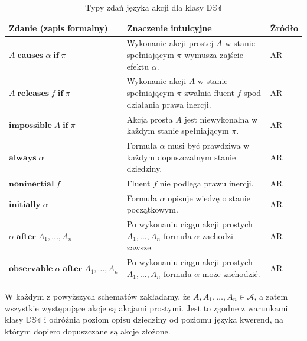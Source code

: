 \documentclass[11pt,a4paper]{article}
\theoremstyle{definition}
\begin{document}
\begin{table}[ht]
\centering
\caption{Typy zdań języka akcji dla klasy $\mathbb{DS4}$}
\label{tab:ds4-action-language}
\renewcommand{\arraystretch}{1.2}
\begin{tabular}{|p{}|p{}|p{}|}
\hline
\textbf{Zdanie (zapis formalny)} & \textbf{Znaczenie intuicyjne} & \textbf{Źródło} \\ \hline

$A \;\textbf{causes}\; \alpha \;\textbf{if}\; \pi$ &
Wykonanie akcji prostej $A$ w stanie spełniającym $\pi$ wymusza zajście efektu $\alpha$. &
AR \\ \hline

$A \;\textbf{releases}\; f \;\textbf{if}\; \pi$ &
Wykonanie akcji $A$ w stanie spełniającym $\pi$ zwalnia fluent $f$ spod działania prawa inercji. &
AR \\ \hline

$\textbf{impossible}\; A \;\textbf{if}\; \pi$ &
Akcja prosta $A$ jest niewykonalna w każdym stanie spełniającym $\pi$. &
AR \\ \hline

$\textbf{always}\; \alpha$ &
Formuła $\alpha$ musi być prawdziwa w każdym dopuszczalnym stanie dziedziny. &
AR \\ \hline

$\textbf{noninertial}\; f$ &
Fluent $f$ nie podlega prawu inercji. &
AR \\ \hline

$\textbf{initially}\; \alpha$ &
Formuła $\alpha$ opisuje wiedzę o stanie początkowym. &
AR \\ \hline

$\alpha \;\textbf{after}\; A_1,\dots,A_n$ &
Po wykonaniu ciągu akcji prostych $A_1,\dots,A_n$ formuła $\alpha$ zachodzi zawsze. &
AR \\ \hline

$\textbf{observable}\; \alpha \;\textbf{after}\; A_1,\dots,A_n$ &
Po wykonaniu ciągu akcji prostych $A_1,\dots,A_n$ formuła $\alpha$ może zachodzić. &
AR \\ \hline

\end{tabular}
\end{table}

W każdym z powyższych schematów zakładamy, że $A,A_1,\dots,A_n \in \mathcal{A}$, a zatem wszystkie występujące akcje są akcjami prostymi. Jest to zgodne z warunkami klasy $\mathbb{DS4}$ i odróżnia poziom opisu dziedziny od poziomu języka kwerend, na którym dopiero dopuszczane są akcje złożone.
\end{document}
